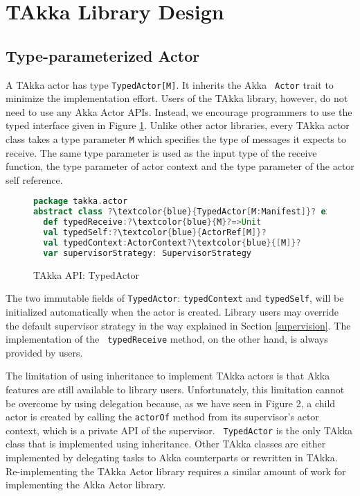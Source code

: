 \section{TAkka Library Design}


\subsection{Type-parameterized Actor}
\label{actor}
A TAkka actor has type {\tt TypedActor[M]}.  It inherits the Akka {\tt
Actor} trait to minimize the implementation effort.  Users of the TAkka library,
however, do not need to use any Akka Actor APIs.  Instead, we encourage
programmers to use the typed interface given in Figure \ref{takka_actor_api}. 
 Unlike other actor libraries, every TAkka actor class takes a type parameter 
{\tt M} which specifies the type of messages it expects to receive.  The same 
type parameter is used as the input type of the receive function, the type 
parameter of actor context and the type parameter of the actor self reference.

\begin{figure}
\label{takka_actor_api}
\begin{lstlisting}[language=scala, escapechar=?]
package takka.actor
abstract class ?\textcolor{blue}{TypedActor[M:Manifest]}? extends akka.actor.Actor
  def typedReceive:?\textcolor{blue}{M}?=>Unit
  val typedSelf:?\textcolor{blue}{ActorRef[M]}?
  val typedContext:ActorContext?\textcolor{blue}{[M]}?
  var supervisorStrategy: SupervisorStrategy
\end{lstlisting}
\caption{TAkka API: TypedActor}
\end{figure}

The two immutable fields of {\tt TypedActor}: {\tt typedContext} and 
{\tt typedSelf}, will be initialized automatically when the actor is created.
Library users may override the default supervisor strategy in the
way explained in Section \ref{supervision}.  The implementation of the {\tt
typedReceive} method, on the other hand, is always provided by users.

The limitation of using inheritance to implement TAkka actors is that Akka 
features are still available to library users.  Unfortunately, this limitation 
cannot be overcome by using delegation because, as we have seen in Figure 2, 
a child actor is created by calling the {\tt actorOf} method from its 
supervisor's actor context, which is a private API of the supervisor.  {\tt 
TypedActor} is the only TAkka class that is implemented using inheritance. 
Other TAkka classes are either implemented by delegating tasks to Akka 
counterparts or rewritten in TAkka.  Re-implementing the TAkka 
Actor library requires a similar amount of work for implementing the Akka Actor 
library.


